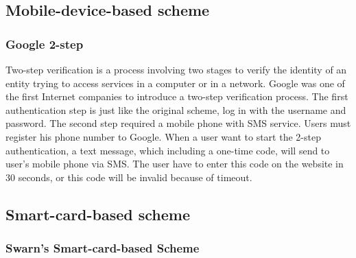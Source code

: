 \begin{CJK}{Bg5}{bsmi}
\subsection{Mobile-device-based scheme}

\subsubsection{Google 2-step}

Two-step verification is a process involving two stages to verify the identity of an entity trying to access services in a computer or in a network. Google was one of the first Internet companies to introduce a two-step verification process. The first authentication step is just like the original scheme, log in with the username and password. The second step required a mobile phone with SMS service. Users must register his phone number to Google. When a user want to start the 2-step authentication, a text message, which including a one-time code, will send to user's mobile phone via SMS. The user have to enter this code on the website in 30 seconds, or this code will be invalid because of timeout.

\subsection{Smart-card-based scheme}

\subsubsection{Swarn's Smart-card-based Scheme}

\end{CJK}